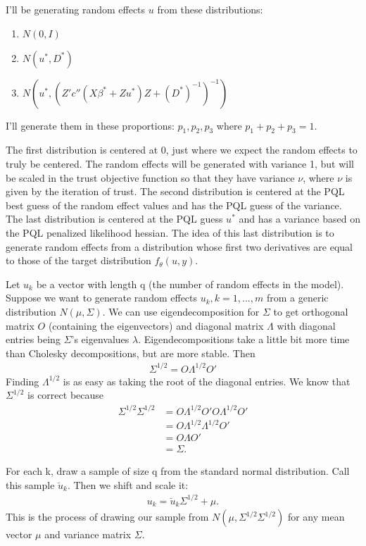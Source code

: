 \documentclass{article}
\begin{document}
I'll be generating random effects $u$ from these distributions:
\begin{enumerate}
\item $N(0,I)$
\item $N(u^*,D^*)$
\item $N(u^*,(Z'  c''(X \beta^*+Zu^*) Z +(D^*)^{-1}   )^{-1})$
\end{enumerate}
I'll generate them in these proportions: $p_1,p_2,p_3$ where $p_1+p_2+p_3=1$.

The first distribution is centered at 0, just where we expect the random effects to truly be centered. The random effects will be generated with variance 1, but will be scaled in the trust objective function so that they have variance $\nu$, where $\nu$ is given by the iteration of trust.   The second distribution is centered at the PQL best guess of the random effect values and  has the PQL guess of the variance. The last distribution is centered at the PQL guess $u^*$ and has a variance based on the PQL penalized likelihood hessian.  The idea of this last distribution is to generate random effects from a distribution whose first two derivatives are equal to those of the target distribution $f_\theta(u,y)$.

Let $u_k$ be a vector with length q (the number of random effects in the model). Suppose we want to generate random effects $u_k,k=1,...,m$ from a generic distribution $N(\mu,\Sigma)$.  We can use eigendecomposition for $\Sigma$ to get orthogonal matrix $O$ (containing the eigenvectors) and diagonal matrix $\Lambda$ with diagonal entries being $\Sigma$'s eigenvalues $\lambda$. Eigendecompositions take a little bit more time than Cholesky decompositions, but are more stable. Then
\begin{align}
\Sigma^{1/2}= O \Lambda^{1/2} O'
\end{align}
Finding $\Lambda^{1/2}$ is as easy as taking the root of the diagonal entries.  We know that $\Sigma^{1/2}$ is correct because
\begin{align}
\Sigma^{1/2} \Sigma^{1/2} &= O \Lambda^{1/2} O'O \Lambda^{1/2} O'\\
&= O \Lambda^{1/2}\Lambda^{1/2} O'\\
&=O \Lambda O' \\
&= \Sigma.
\end{align}

For each k, draw a sample of size q from the standard normal distribution. Call this sample $\breve{u}_k$. Then we shift and scale it:
\begin{align}
u_k = \breve{u}_k \Sigma^{1/2} + \mu.
\end{align}
This is the process of drawing our sample from $N(\mu,\Sigma^{1/2}\Sigma^{1/2})$ for any mean vector $\mu$ and variance matrix $\Sigma$. 
\end{document}
